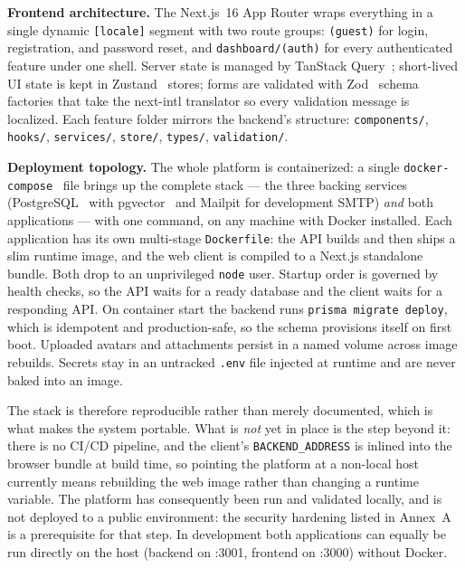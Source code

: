 {\renewcommand{\figmaxheight}{0.55\textheight}%
}

\textbf{Frontend architecture.} The Next.js~16 App Router wraps everything in a single dynamic
\texttt{[locale]} segment with two route groups: \texttt{(guest)} for login, registration, and
password reset, and \texttt{dashboard/(auth)} for every authenticated feature under one shell.
Server state is managed by TanStack Query~\cite{tanstackquery}; short-lived UI state is kept
in Zustand~\cite{zustand} stores; forms are validated with Zod~\cite{zod} schema factories that
take the next-intl translator so every validation message is localized. Each feature folder
mirrors the backend's structure: \texttt{components/}, \texttt{hooks/}, \texttt{services/},
\texttt{store/}, \texttt{types/}, \texttt{validation/}.

\textbf{Deployment topology.} The whole platform is containerized: a single
\texttt{docker-compose}~\cite{docker} file brings up the complete stack --- the three backing
services (PostgreSQL~\cite{postgresql} with pgvector~\cite{pgvector} and
Mailpit for development SMTP) \emph{and} both applications --- with one command, on any machine
with Docker installed. Each application has its own multi-stage \texttt{Dockerfile}: the API
builds and then ships a slim runtime image, and the web client is compiled to a Next.js
standalone bundle. Both drop to an unprivileged \texttt{node} user. Startup order is governed by
health checks, so the API waits for a ready database and the client waits for a responding API.
On container start the backend runs \texttt{prisma migrate deploy}, which is idempotent and
production-safe, so the schema provisions itself on first boot. Uploaded avatars and attachments
persist in a named volume across image rebuilds. Secrets stay in an untracked \texttt{.env} file
injected at runtime and are never baked into an image.

The stack is therefore reproducible rather than merely documented, which is what makes the
system portable. What is \emph{not} yet in place is the step beyond it: there is no CI/CD
pipeline, and the client's \texttt{BACKEND\_ADDRESS} is inlined into the browser bundle at build
time, so pointing the platform at a non-local host currently means rebuilding the web image
rather than changing a runtime variable. The platform has consequently been run and validated
locally, and is not deployed to a public environment: the security hardening listed in
Annex~A is a prerequisite for that step. In development both applications can equally
be run directly on the host (backend on :3001, frontend on :3000) without Docker.

